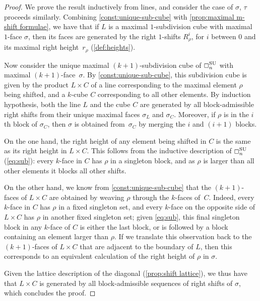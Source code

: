 \begin{proof}
We prove the result inductively from lines, and consider the case of $\sigma$, $\tau$ proceeds similarly.
Combining \cref{const:unique-sub-cube} with \cref{prop:maximal m-shift formulae}, we have that if $L$ is a maximal $1$-subdivision cube with maximal $1$-face $\sigma$, then its faces are generated by the right $1$-shifts $R_\rho^i$, for $i$ between $0$ and its maximal right height~$r_\rho$ (\cref{def:heights}).

Now consider the unique maximal $(k+1)$-subdivision cube of $\Box_{n}^{\mathrm{SU}}$ with maximal $(k+1)$-face~$\sigma$.
By \cref{const:unique-sub-cube}, this subdivision cube is given by the product $L\times C$ of a line corresponding to the maximal element $\rho$ being shifted, and a $k$-cube $C$ corresponding to all other elements.
By induction hypothesis, both the line $L$ and the cube $C$ are generated by all block-admissible right shifts from their unique maximal faces $\sigma_L$ and $\sigma_C$.
Moreover, if $\rho$ is in the $i$th block of $\sigma_C$, then $\sigma$ is obtained from~$\sigma_C$ by merging the $i$\ordinal{} and $(i+1)$\ordinalst{} blocks.

On the one hand, the right height of any element being shifted in $C$ is the same as its right height in $L\times C$.
This follows from the inductive description of $\Box_{n}^{\mathrm{SU}}$ (\cref{eq:sub}): every $k$-face in $C$ has $\rho$ in a singleton block, and as $\rho$ is larger than all other elements it blocks all other shifts.

On the other hand, we know from \cref{const:unique-sub-cube} that the $(k+1)$-faces of $L\times C$ are obtained by weaving $\rho$ through the $k$-faces of~$C$.
Indeed, every $k$-face in $C$ has $\rho$ in a fixed singleton set, and every $k$-face on the opposite side of $L\times C$ has $\rho$ in another fixed singleton set; given \cref{eq:sub}, this final singleton block in any $k$-face of $C$ is either the last block, or is followed by a block containing an element larger than $\rho$.
If we translate this observation back to the $(k+1)$-faces of $L\times C$ that are adjacent to the boundary of $L$, then this corresponds to an equivalent calculation of the right height of $\rho$ in $\sigma$.

Given the lattice description of the diagonal (\cref{prop:shift lattice}), we thus have that $L\times C$ is generated by all block-admissible sequences of right shifts of $\sigma$, which concludes the proof.
\end{proof}

